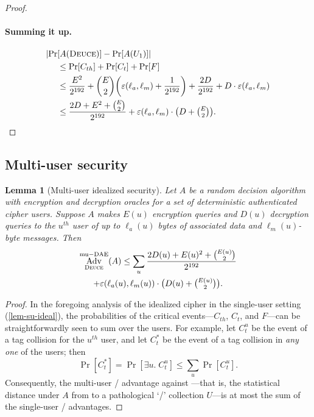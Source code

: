 \documentclass[draft]{article}
\newtheorem{lemma}{Lemma}
\DeclareRobustCommand{\operatorsc}[1]{{%
  \ifmmode\let\next=\operatorname\else\let\next=\relax\fi\next{\textsc{#1}}}}
\def\Deuce/{\operatorsc{Deuce}}
\DeclareMathOperator{\Adv}{Adv}
\DeclareMathOperator{\muDAE}{mu-DAE}
\newcommand{\collisionbound}{\varepsilon}
\begin{document}
\begin{proof}
\paragraph*{Summing it up.}

\begin{align*}
  \lvert\Pr&[A(\Deuce/)] - \Pr[A(U_1)]\rvert \\
  &\leq \Pr[C_{th}] + \Pr[C_t] + \Pr[F] \\
  &\leq \frac{E^2}{2^{192}}
     + \binom{E}{2} \biggl(
         \collisionbound(\ell_a, \ell_m)
         + \frac{1}{2^{192}}
       \biggr)
     + \frac{2 D}{2^{192}} + D \cdot \collisionbound(\ell_a, \ell_m) \\
  &\leq \frac{2 D + E^2 + \binom{E}{2}}{2^{192}}
     + \collisionbound(\ell_a, \ell_m)
       \cdot
       {\textstyle\bigl(D + \binom{E}{2}\bigr)}.
  \qedhere
\end{align*}

\end{proof}

\subsection{Multi-user security}

\begin{lemma}[Multi-user idealized security]\label{lem-mu-ideal}
  Let $A$ be a random decision algorithm with encryption and
   decryption oracles for a \emph{set} of deterministic authenticated
   cipher users.
  Suppose $A$ makes $E(u)$ encryption queries and $D(u)$ decryption
   queries to the $u^{\mathit{th}}$ user of up to $\ell_a(u)$ bytes of
   associated data and $\ell_m(u)$-byte messages.
  Then
%
  \begin{multline*}
    \Adv^{\muDAE}_{\Deuce/}(A)
    \leq \sum_u \frac{2 D(u) + E(u)^2 + \binom{E(u)}{2}}
                     {2^{192}} \\
           + \collisionbound(\ell_a(u), \ell_m(u))
             \cdot
             {\textstyle\bigl(D(u) + \binom{E(u)}{2}\bigr)}.
  \end{multline*}
\end{lemma}

\begin{proof}
  In the foregoing analysis of the idealized cipher \Deuce/ in the
   single-user setting (\autoref{lem-su-ideal}), the probabilities of
   the critical events---$C_{th}$, $C_t$, and $F$---can be
   straightforwardly seen to sum over the users.
  For example, let $C_t^u$ be the event of a tag collision for the
   $u^{\mathit{th}}$ user, and let $C_t^*$ be the event of a tag
   collision in \emph{any one} of the users; then
  \[\textstyle
    \Pr[C_t^*] = \Pr[\exists u.\; C_t^u] \leq \sum_u \Pr[C_t^u].
  \]
  Consequently, the multi-user \DAE/ advantage against \Deuce/---that
   is, the statistical distance under $A$ from \Deuce/ to a
   pathological `\DAE/' collection $U$---is at most the sum of the
   single-user \DAE/ advantages.
\end{proof}
\end{document}
